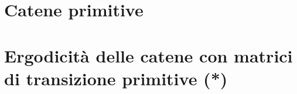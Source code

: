 \documentclass[\main/main.tex]{subfiles}
\begin{document}
\section{Catene primitive}
\section{Ergodicità delle catene con matrici di transizione primitive (*)}
\end{document}
